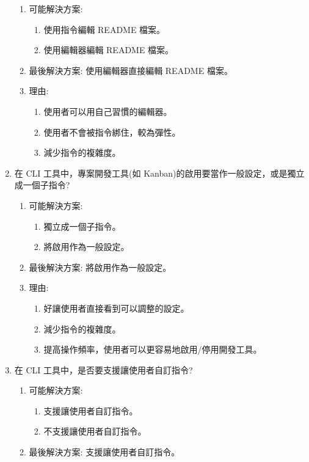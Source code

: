 \documentclass{report}
\begin{document}
\begin{enumerate}
\begin{enumerate}
					\item 可能解決方案:
						\begin{enumerate}
							\item 使用指令編輯 README 檔案。
							\item 使用編輯器編輯 README 檔案。
						\end{enumerate}
					\item 最後解決方案: 使用編輯器直接編輯 README 檔案。
					\item 理由:
						\begin{enumerate}
							\item 使用者可以用自己習慣的編輯器。
							\item 使用者不會被指令綁住，較為彈性。
							\item 減少指令的複雜度。
						\end{enumerate}
				\end{enumerate}
			\item 在 CLI 工具中，專案開發工具(如 Kanban)的啟用要當作一般設定，或是獨立成一個子指令?
				\begin{enumerate}
					\item 可能解決方案:
						\begin{enumerate}
							\item 獨立成一個子指令。
							\item 將啟用作為一般設定。
						\end{enumerate}
					\item 最後解決方案: 將啟用作為一般設定。
					\item 理由:
						\begin{enumerate}
							\item 好讓使用者直接看到可以調整的設定。
							\item 減少指令的複雜度。
							\item 提高操作頻率，使用者可以更容易地啟用/停用開發工具。
						\end{enumerate}
				\end{enumerate}
			\item 在 CLI 工具中，是否要支援讓使用者自訂指令?
				\begin{enumerate}
					\item 可能解決方案:
						\begin{enumerate}
							\item 支援讓使用者自訂指令。
							\item 不支援讓使用者自訂指令。
						\end{enumerate}
					\item 最後解決方案: 支援讓使用者自訂指令。

\end{enumerate}
\end{enumerate}
\end{document}
